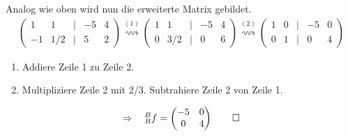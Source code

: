 \documentclass[titlepage]{article}
\newcommand{\1}{\mathbb{1}}
\newcommand{\0}{\mathbb{0}}
\begin{document}
		Analog wie oben wird nun die erweiterte Matrix gebildet.
		\begin{align*}
			\begin{pmatrix}
				1&1&|&-5&4\\
				-1&1/2&|&5&2
			\end{pmatrix}
			\overset{(1)}{\rightsquigarrow}
			\begin{pmatrix}
				1&1&|&-5&4\\
				0&3/2&|&0&6
			\end{pmatrix}
			\overset{(2)}{\rightsquigarrow}
			\begin{pmatrix}
				1&0&|&-5&0\\
				0&1&|&0&4
			\end{pmatrix}
		\end{align*}
		\begin{enumerate}
			\item Addiere Zeile 1 zu Zeile 2.
			\item Multipliziere Zeile 2 mit 2/3. Subtrahiere Zeile 2 von Zeile 1.
		\end{enumerate}
		\begin{align*}
			\Rightarrow\quad^B_Bf=\begin{pmatrix}-5&0\\0&4\end{pmatrix}\qed
		\end{align*}
\end{document}
